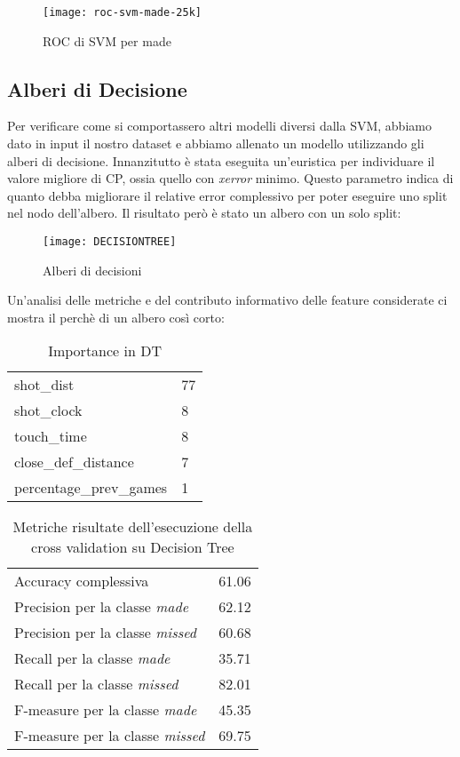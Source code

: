 \begin{figure}[H]
\centering
\caption{ROC di SVM per made}
\label{roc svm}
  \texttt{[image: roc-svm-made-25k]}
\end{figure}


\pagebreak
\subsection{Alberi di Decisione}
Per verificare come si comportassero altri modelli diversi dalla SVM, abbiamo dato in input il nostro dataset e abbiamo allenato un modello utilizzando gli alberi di decisione.
Innanzitutto è stata eseguita un'euristica per individuare il valore migliore di CP, ossia quello con \textit{xerror} minimo. Questo parametro indica di quanto debba migliorare il relative error complessivo per poter eseguire uno split nel nodo dell'albero.
Il risultato però è stato un albero con un solo split:

\begin{figure}[H]
\caption{Alberi di decisioni}
\label{dt_fig}
  \texttt{[image: DECISIONTREE]}
\end{figure}


Un'analisi delle metriche e del contributo informativo delle feature considerate ci mostra il perchè di un albero così corto:
\begin{table}[H]
\centering
  \begin{tabular}{l l} 
shot\_dist &77\\
shot\_clock &8\\
touch\_time &8\\
close\_def\_distance &7\\
percentage\_prev\_games &1\\
    \end{tabular}
    \caption{Importance in DT}
\end{table}

\begin{table}[h!]
\centering
  \begin{tabular}{l l} 
  Accuracy complessiva & 61.06\\
  Precision per la classe \textit{made} & 62.12\\
  Precision per la classe \textit{missed} & 60.68\\
  Recall per la classe \textit{made} & 35.71\\
  Recall per la classe \textit{missed} & 82.01\\
  F-measure per la classe \textit{made} & 45.35\\
  F-measure per la classe \textit{missed} & 69.75\\
    \end{tabular}
    \caption{Metriche risultate dell'esecuzione della cross validation su Decision Tree}
\end{table}


